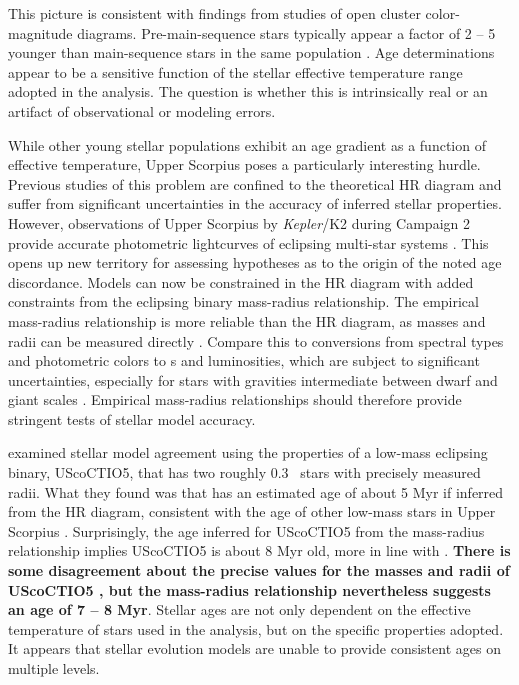 \documentclass{aa}
\begin{document}
This picture is consistent with findings from studies of open cluster color-magnitude diagrams. Pre-main-sequence stars typically appear a factor of 2 -- 5 younger than main-sequence stars in the same population \citep{Naylor2009, Bell2012, Bell2013}. Age determinations appear to be a sensitive function of the stellar effective temperature range adopted in the analysis. The question is whether this is intrinsically real or an artifact of observational or modeling errors. 


While other young stellar populations exhibit an age gradient as a function of effective temperature, Upper Scorpius poses a particularly interesting hurdle. Previous studies of this problem are confined to the theoretical HR diagram and suffer from significant uncertainties in the accuracy of inferred stellar properties. However, observations of Upper Scorpius by \emph{Kepler}/K2 during Campaign 2 provide accurate photometric lightcurves of eclipsing multi-star systems \citep{Kraus2015, Alonso2015, David2015b, Lodieu2015}. This opens up new territory for assessing hypotheses as to the origin of the noted age discordance. Models can now be constrained in the HR diagram with added constraints from the eclipsing binary mass-radius relationship. The empirical mass-radius relationship is more reliable than the HR diagram, as masses and radii can be measured directly \citep[e.g.,][]{Andersen1991,Torres2010}. Compare this to conversions from spectral types and photometric colors to \teff s and luminosities, which are subject to significant uncertainties, especially for stars with gravities intermediate between dwarf and giant scales \citep[see, e.g.,][]{Pecaut2013}. Empirical mass-radius relationships should therefore provide stringent tests of stellar model accuracy.

\citet{Kraus2015} examined stellar model agreement using the properties of a low-mass eclipsing binary, UScoCTIO5, that has two roughly 0.3 \msun\ stars with precisely measured radii. What they found was that  has an estimated age of about 5 Myr if inferred from the HR diagram, consistent with the age of other low-mass stars in Upper Scorpius \citep{Preibisch2002, Slesnick2008}. Surprisingly, the age inferred for UScoCTIO5 from the mass-radius relationship implies UScoCTIO5 is about 8 Myr old, more in line with \citet{Pecaut2012}. {\bf There is some disagreement about the precise values for the masses and radii of UScoCTIO5 \citep{David2015b}, but the mass-radius relationship nevertheless suggests an age of 7 -- 8 Myr}. Stellar ages are not only dependent on the effective temperature of stars used in the analysis, but on the specific properties adopted. It appears that stellar evolution models are unable to provide consistent ages on multiple levels.
\end{document}
